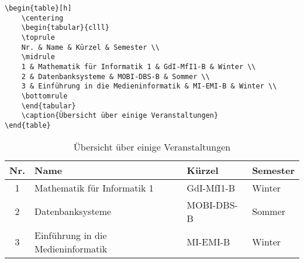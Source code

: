 \begin{verbatim}
\begin{table}[h]
	\centering
	\begin{tabular}{clll}
	\toprule
	Nr. & Name & Kürzel & Semester \\
	\midrule
	1 & Mathematik für Informatik 1 & GdI-MfI1-B & Winter \\
	2 & Datenbanksysteme & MOBI-DBS-B & Sommer \\
	3 & Einführung in die Medieninformatik & MI-EMI-B & Winter \\		
	\bottomrule
	\end{tabular}
	\caption{Übersicht über einige Veranstaltungen}
\end{table}
\end{verbatim}

\begin{table}[h]
	\centering
	\begin{tabular}{clll}
		\toprule
		Nr.	&	Name & Kürzel & Semester \\
		\midrule
		1	&	Mathematik für Informatik 1	       &	GdI-MfI1-B &	Winter	\\
		2	&	Datenbanksysteme			             &	MOBI-DBS-B &	Sommer	\\
		3	&	Einführung in die Medieninformatik &	MI-EMI-B	 &	Winter	\\		
		\bottomrule
	\end{tabular}
	\caption{Übersicht über einige Veranstaltungen}
\end{table}